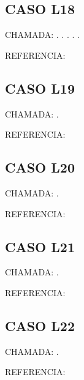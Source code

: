 \documentclass{undftex}
\begin{document}
\begin{refsection}\section*{CASO L18} CHAMADA: . \textcite{l03}. . . . \par REFERENCIA:\par\printbibliography[heading=none,check=undfconsultadas]\end{refsection}\clearpage
\begin{refsection}\section*{CASO L19} CHAMADA: . \textcite{lorigtrad}\par REFERENCIA:\par\printbibliography[heading=none,check=undfconsultadas]\end{refsection}\clearpage
\begin{refsection}\section*{CASO L20} CHAMADA: . \textcite{l20}\par REFERENCIA:\par\printbibliography[heading=none,check=undfconsultadas]\end{refsection}\clearpage
\begin{refsection}\section*{CASO L21} CHAMADA: . \textcite{l21}\par REFERENCIA:\par\printbibliography[heading=none,check=undfconsultadas]\end{refsection}\clearpage
\begin{refsection}\section*{CASO L22} CHAMADA: . \textcite{l22}\par REFERENCIA:\par\printbibliography[heading=none,check=undfconsultadas]\end{refsection}\clearpage
\end{document}
